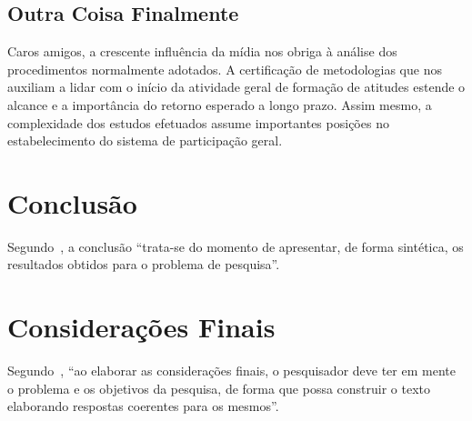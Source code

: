 \documentclass[font=plain,chapter=TITLE,section=Title,espaco=duplo,tocpage=plain,appendix=Name,floatnumber=continuous]{abnt}
\begin{document}
\section{Outra Coisa Finalmente}

Caros amigos, a crescente influência da mídia nos obriga à análise dos
procedimentos normalmente adotados. A certificação de metodologias que nos
auxiliam a lidar com o início da atividade geral de formação de atitudes
estende o alcance e a importância do retorno esperado a longo prazo. Assim
mesmo, a complexidade dos estudos efetuados assume importantes posições no
estabelecimento do sistema de participação geral.

\chapter{Conclusão}

Segundo~\cite{normasUTP}, a conclusão “trata-se do momento de apresentar,
de forma sintética, os resultados obtidos para o problema de pesquisa”.

\chapter{Considerações Finais}

Segundo~\cite{normasUTP}, “ao elaborar as considerações finais, o
pesquisador deve ter em mente o problema e os objetivos da pesquisa, de
forma que possa construir o texto elaborando respostas coerentes para os
mesmos”.

%
%

\end{document}

